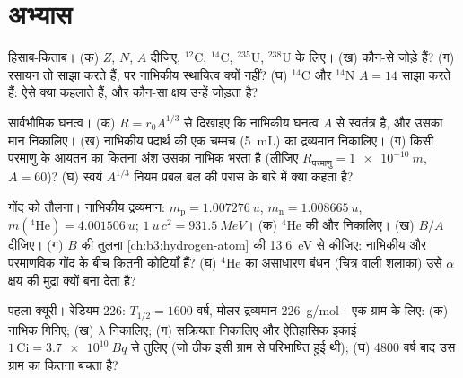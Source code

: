 \section{अभ्यास}

\begin{exercise}[$\star$]\label{exo:b3:nuclear-physics:1}
हिसाब-किताब। (क) $Z$, $N$, $A$ दीजिए, $^{12}$C, $^{14}$C,
$^{235}$U, $^{238}$U के लिए। (ख) कौन-से जोड़े
 हैं? (ग)  रसायन तो साझा करते हैं, पर नाभिकीय
स्थायित्व क्यों नहीं? (घ) $^{14}$C
और $^{14}$N $A = 14$ साझा करते हैं: ऐसे  क्या कहलाते हैं,
और कौन-सा क्षय उन्हें जोड़ता है?
\end{exercise}

\begin{exercise}[$\star$]\label{exo:b3:nuclear-physics:2}
सार्वभौमिक घनत्व। (क) $R = r_0A^{1/3}$ से दिखाइए कि
नाभिकीय घनत्व $A$ से स्वतंत्र है, और उसका मान निकालिए। (ख)
नाभिकीय पदार्थ की एक चम्मच (\qty{5}{mL}) का द्रव्यमान निकालिए।
(ग) किसी परमाणु के आयतन का कितना अंश उसका नाभिक भरता है (लीजिए
$R_{\text{परमाणु}} = \qty{1e-10}{m}$, $A = 60$)? (घ) स्वयं
$A^{1/3}$ नियम प्रबल बल की परास के बारे में क्या कहता है?
\end{exercise}

\begin{exercise}[$\star$]\label{exo:b3:nuclear-physics:3}
गोंद को तौलना। नाभिकीय द्रव्यमान: $m_{\text{p}} =
\qty{1.007276}{u}$, $m_{\text{n}} = \qty{1.008665}{u}$,
$m(^4\text{He}) = \qty{4.001506}{u}$;
$\qty{1}{u}\,c^2 = \qty{931.5}{MeV}$। (क) $^4$He की  और  निकालिए। (ख) $B/A$ दीजिए। (ग) $B$ की तुलना
\cref{ch:b3:hydrogen-atom} की \qty{13.6}{eV} से कीजिए: नाभिकीय और
परमाणविक गोंद के बीच कितनी कोटियाँ हैं? (घ)
$^4$He का असाधारण बंधन (चित्र वाली शलाका) उसे $\alpha$ क्षय की मुद्रा
क्यों बना देता है?
\end{exercise}

\begin{exercise}[$\star$]\label{exo:b3:nuclear-physics:4}
पहला क्यूरी। रेडियम-226: $T_{1/2} = 1600$ वर्ष, मोलर द्रव्यमान
\qty{226}{g/mol}। एक ग्राम के लिए: (क) नाभिक गिनिए; (ख)
$\lambda$ निकालिए; (ग) सक्रियता निकालिए और ऐतिहासिक इकाई
$1\,\text{Ci} = \qty{3.7e10}{Bq}$ से तुलिए (जो ठीक इसी
ग्राम से परिभाषित हुई थी); (घ) 4800 वर्ष बाद उस ग्राम का कितना बचता है?
\end{exercise}

